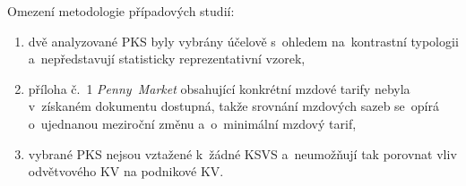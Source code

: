 Omezení metodologie případových studií:
\begin{enumerate}[noitemsep]
  \item dvě analyzované \acs{PKS} byly vybrány účelově s~ohledem na~kontrastní typologii a~nepředstavují statisticky reprezentativní vzorek,
  \item příloha č.~1  \emph{Penny~Market} obsahující konkrétní mzdové tarify nebyla v~získaném dokumentu dostupná, takže srovnání mzdových sazeb se~opírá o~ujednanou meziroční změnu a~o~minimální mzdový tarif,
  \item vybrané \acs{PKS} nejsou vztažené k~žádné \acs{KSVS} a~neumožňují tak porovnat vliv odvětvového \acs{KV} na podnikové \ac{KV}.\par
\end{enumerate}
